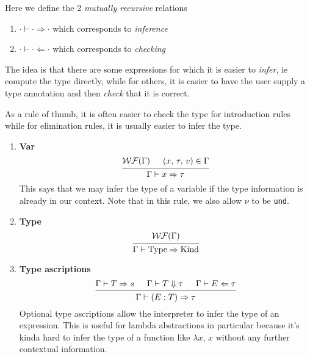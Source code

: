 \documentclass{article}
\begin{document}
\begin{definition} 
  Here we define the 2 \textit{mutually recursive} relations
  \begin{enumerate}
  \item$\cdot \vdash \cdot \Rightarrow \cdot $ which corresponds to \textit{inference}
  \item$\cdot \vdash \cdot \Leftarrow \cdot$ which corresponds to \textit{checking}
  \end{enumerate}

  The idea is that there are some expressions for which it is easier to
  \textit{infer},
  ie compute the type directly, while for others, it is easier to have the user
  supply a type annotation and then \textit{check} that it is correct.

  As a rule of thumb, it is often easier to check the type for
  introduction rules while for elimination rules, it is usually easier to infer
  the type.

  \begin{enumerate}
  \item \textbf{Var} \\
    \[
      \begin{prooftree}
        \hypo{\wf(\Gamma)}
        \hypo{(x, \, \tau, \, v) \in \Gamma}
        \infer2{\Gamma \vdash x \Rightarrow \tau}
      \end{prooftree}
    \]
    This says that we may infer the type of a variable if the type information
    is already in our context.
    Note that in this rule, we also allow $\nu$ to be \verb|und|.

  \item \textbf{Type} \\
    \[
      \begin{prooftree}
        \hypo{\wf(\Gamma)}
        \infer1{\Gamma \vdash \Type \Rightarrow \Kind}
      \end{prooftree}
    \]


  \item \textbf{Type ascriptions} \\
    \[
      \begin{prooftree}
        \hypo{\Gamma \vdash T \Rightarrow s}
        \hypo{\Gamma \vdash T \Downarrow \tau}
        \hypo{\Gamma \vdash E \Leftarrow \tau}
        \infer3{\Gamma \vdash (E : T) \Rightarrow \tau}
      \end{prooftree}
    \]
    Optional type ascriptions allow the interpreter to infer the type of an
    expression. This is useful for lambda abstractions in particular because it's
    kinda hard to infer the type of a function like $\lambda x, \, x$ without any
    further contextual information.


\end{enumerate}
\end{definition}
\end{document}
